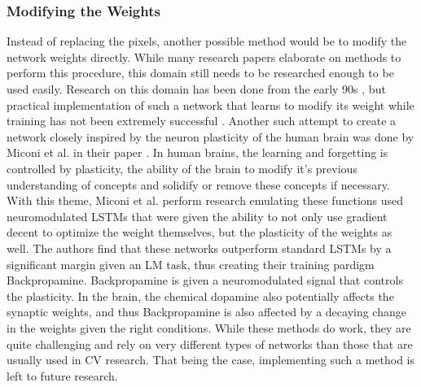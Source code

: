 

\subsubsection{Modifying the Weights}
Instead of replacing the pixels, another possible method would be to modify the network weights directly. While many research papers elaborate on methods to perform this procedure, this domain still needs to be researched enough to be used easily. Research on this domain has been done from the early 90s \cite{schmidhuberSelfReferentialWeightMatrix1993}, but practical implementation of such a network that learns to modify its weight while training has not been extremely successful \cite{irieModernSelfReferentialWeight2022}. 
Another such attempt to create a network closely inspired by the neuron plasticity of the human brain was done by Miconi et al. in their paper \cite{miconiBackpropamineTrainingSelfmodifying2020}. In human brains, the learning and forgetting is controlled by plasticity, the ability of the brain to modify it's previous understanding of concepts and solidify or remove these concepts if necessary. With this theme, Miconi et al. perform research emulating these functions used neuromodulated LSTMs that were given the ability to not only use gradient decent to optimize the weight themselves, but the plasticity of the weights as well. The authors find that these networks outperform standard LSTMs by a significant margin given an LM task, thus creating their training pardigm Backpropamine. Backpropamine is given a neuromodulated signal that controls the plasticity. In the brain, the chemical dopamine also potentially affects the synaptic weights, and thus Backpropamine is also affected by a decaying change in the weights given the right conditions.
While these methods do work, they are quite challenging and rely on very different types of networks than those that are usually used in CV research. That being the case, implementing such a method is left to future research.

